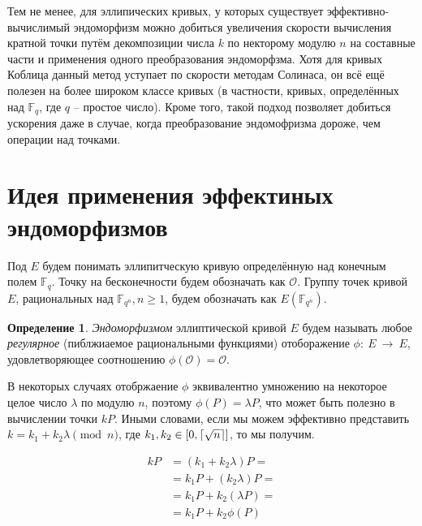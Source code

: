 \documentclass[a4paper,12pt]{article}
\DeclarePairedDelimiter\ceil{\lceil}{\rceil}
\theoremstyle{definition}
\newtheorem{defn}{Определение}
\theoremstyle{underline}
\begin{document}
	Тем не менее, для эллипических кривых, у которых существует эффективно-вычислимый эндоморфизм можно добиться увеличения скорости вычисления кратной точки путём декомпозиции числа $k$ по некторому модулю $n$ на составные части и применения одного преобразования эндоморфзма. Хотя для кривых Коблица данный метод уступает по скорости методам Солинаса, он всё ещё полезен на более широком классе кривых (в частности, кривых, определённых над $\mathbb{F}_q$, где $q$ -- простое число). Кроме того, такой подход позволяет добиться ускорения даже в случае, когда преобразование эндомофризма дороже, чем операции над точками.
	
	\newpage
	
	\section{Идея применения эффектиных эндоморфизмов}
	
	Под $E$ будем понимать эллипитческую кривую определённую над конечным полем $\mathbb{F}_q$. Точку на бесконечности будем обозначать как $\mathcal{O}$. Группу точек кривой $E$, рациональных над $\mathbb{F}_{q^n}, n \geqslant 1$, будем обозначать как $E(\mathbb{F}_{q^n})$.
	
	\begin{defn}\label{def:endo}
	\emph{Эндоморфизмом} эллиптической кривой $E$ будем называть любое \emph{регулярное} (пиблжиаемое рациональными функциями) отоборажение $\phi:~E~\rightarrow~E $, удовлетворяющее соотношению $\phi(\mathcal{O}) = \mathcal{O}$.
	\end{defn}

	В некоторых случаях отобржаение $\phi$ эквивалентно умножению на некоторое целое число $\lambda$ по модулю $n$, поэтому $\phi(P) = \lambda P$, что может быть полезно в вычислении точки $k P$. Иными словами, если мы можем эффективно представить $k = k_1 + k_2 \lambda \pmod{n}$, где $k_1, k_2 \in [0, \ceil{\sqrt{n}}]$, то мы получим.

	\begin{equation} \label{eq:decomp}
		\begin{aligned}
			kP &= (k_1 + k_2 \lambda) P = \\
			   &= k_1 P + (k_2 \lambda) P = \\
   			   &= k_1 P + k_2 (\lambda P) = \\
   			   &= k_1 P + k_2 \phi(P) \\
		\end{aligned}
	\end{equation}
	
\end{document}
